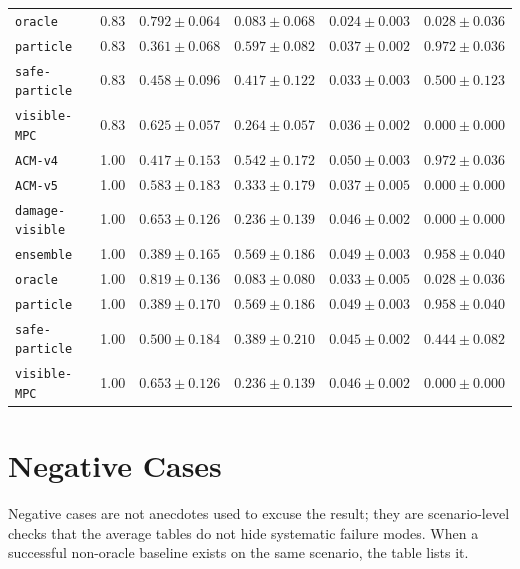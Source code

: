 \documentclass{article}
\begin{document}
\begin{center}
\begin{tabular}{lccccc}
\texttt{oracle} & 0.83 & $0.792 \pm 0.064$ & $0.083 \pm 0.068$ & $0.024 \pm 0.003$ & $0.028 \pm 0.036$ \\
\texttt{particle} & 0.83 & $0.361 \pm 0.068$ & $0.597 \pm 0.082$ & $0.037 \pm 0.002$ & $0.972 \pm 0.036$ \\
\texttt{safe-particle} & 0.83 & $0.458 \pm 0.096$ & $0.417 \pm 0.122$ & $0.033 \pm 0.003$ & $0.500 \pm 0.123$ \\
\texttt{visible-MPC} & 0.83 & $0.625 \pm 0.057$ & $0.264 \pm 0.057$ & $0.036 \pm 0.002$ & $0.000 \pm 0.000$ \\
\texttt{ACM-v4} & 1.00 & $0.417 \pm 0.153$ & $0.542 \pm 0.172$ & $0.050 \pm 0.003$ & $0.972 \pm 0.036$ \\
\texttt{ACM-v5} & 1.00 & $0.583 \pm 0.183$ & $0.333 \pm 0.179$ & $0.037 \pm 0.005$ & $0.000 \pm 0.000$ \\
\texttt{damage-visible} & 1.00 & $0.653 \pm 0.126$ & $0.236 \pm 0.139$ & $0.046 \pm 0.002$ & $0.000 \pm 0.000$ \\
\texttt{ensemble} & 1.00 & $0.389 \pm 0.165$ & $0.569 \pm 0.186$ & $0.049 \pm 0.003$ & $0.958 \pm 0.040$ \\
\texttt{oracle} & 1.00 & $0.819 \pm 0.136$ & $0.083 \pm 0.080$ & $0.033 \pm 0.005$ & $0.028 \pm 0.036$ \\
\texttt{particle} & 1.00 & $0.389 \pm 0.170$ & $0.569 \pm 0.186$ & $0.049 \pm 0.003$ & $0.958 \pm 0.040$ \\
\texttt{safe-particle} & 1.00 & $0.500 \pm 0.184$ & $0.389 \pm 0.210$ & $0.045 \pm 0.002$ & $0.444 \pm 0.082$ \\
\texttt{visible-MPC} & 1.00 & $0.653 \pm 0.126$ & $0.236 \pm 0.139$ & $0.046 \pm 0.002$ & $0.000 \pm 0.000$ \\
\bottomrule
\end{tabular}
\end{center}
\normalsize

\section{Negative Cases}
Negative cases are not anecdotes used to excuse the result; they are scenario-level checks that the average tables do not hide systematic failure modes. When a successful non-oracle baseline exists on the same scenario, the table lists it.
\end{document}
